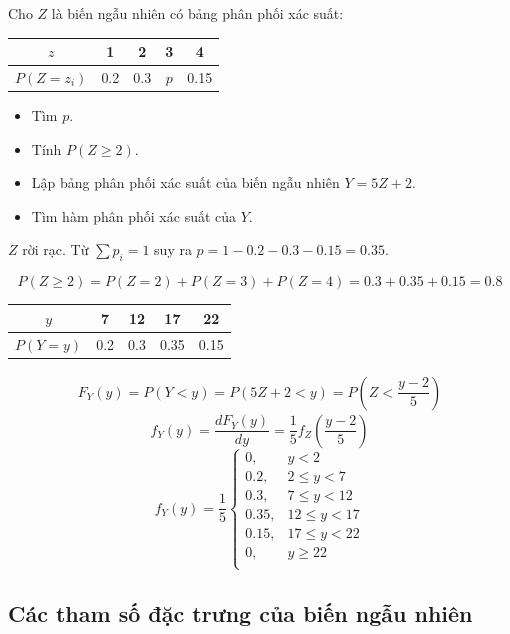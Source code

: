 \documentclass[12pt,a4paper]{article}
\begin{document}
\begin{vidu}
Cho $Z$ là biến ngẫu nhiên có bảng phân phối xác suất:
  \begin{center}
    \begin{tabular}{c|cccc}
      $z$ & 1 & 2 & 3 & 4 \\
      \hline
      $P(Z=z_i)$ & 0.2 & 0.3 & $p$ & 0.15 \\
    \end{tabular}
  \end{center}
  \begin{itemize}
    \item Tìm $p$.
    \item Tính $P(Z \ge 2)$.
    \item Lập bảng phân phối xác suất của biến ngẫu nhiên $Y = 5Z + 2$.
    \item Tìm hàm phân phối xác suất của $Y$.
  \end{itemize}
$Z$ rời rạc. Từ $\displaystyle\sum p_i = 1$ suy ra $p = 1 - 0.2 - 0.3 - 0.15 = 0.35$.

  \[
    P(Z \ge 2) = P(Z = 2) + P(Z = 3) + P(Z = 4) = 0.3 + 0.35 + 0.15 = 0.8
  \]
  \begin{center}
    \begin{tabular}{c|cccc}
      $y$ & 7 & 12 & 17 & 22 \\
      \hline
      $P(Y=y)$ & 0.2 & 0.3 & 0.35 & 0.15 \\
    \end{tabular}
  \end{center}
  \begin{align*}
    F_Y(y) = P(Y < y) = P(5Z + 2 < y) = P(Z < \dfrac{y-2}{5})
  \end{align*}
  \[
    f_Y(y) = \dfrac{dF_Y(y)}{dy} = \dfrac{1}{5} f_Z(\dfrac{y-2}{5})
  \]
  \[
    f_Y(y) = \dfrac{1}{5} \begin{cases}
      0, & y < 2 \\
      0.2, & 2 \le y < 7 \\
      0.3, & 7 \le y < 12 \\
      0.35, & 12 \le y < 17 \\
      0.15, & 17 \le y < 22 \\
      0, & y \ge 22 \\
    \end{cases}
  \]
\end{vidu}

\subsection{Các tham số đặc trưng của biến ngẫu nhiên}
\end{document}
